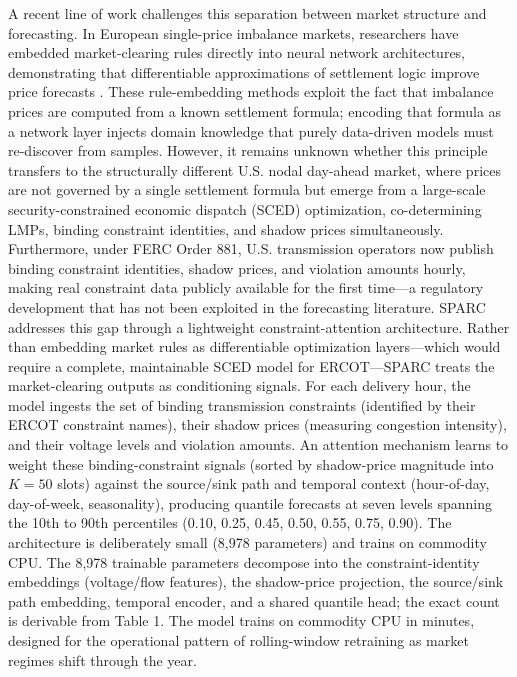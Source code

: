 \documentclass[twoside]{article}
\begin{document}
A recent line of work challenges this separation between market structure and forecasting. In European single-price imbalance markets, researchers have embedded market-clearing rules directly into neural network architectures, demonstrating that differentiable approximations of settlement logic improve price forecasts \cite{yu2026marketruleinformed}. These rule-embedding methods exploit the fact that imbalance prices are computed from a known settlement formula; encoding that formula as a network layer injects domain knowledge that purely data-driven models must re-discover from samples. However, it remains unknown whether this principle transfers to the structurally different U.S. nodal day-ahead market, where prices are not governed by a single settlement formula but emerge from a large-scale security-constrained economic dispatch (SCED) optimization, co-determining LMPs, binding constraint identities, and shadow prices simultaneously. Furthermore, under FERC Order 881, U.S. transmission operators now publish binding constraint identities, shadow prices, and violation amounts hourly, making real constraint data publicly available for the first time---a regulatory development that has not been exploited in the forecasting literature.
SPARC addresses this gap through a lightweight constraint-attention architecture. Rather than embedding market rules as differentiable optimization layers---which would require a complete, maintainable SCED model for ERCOT---SPARC treats the market-clearing outputs as conditioning signals. For each delivery hour, the model ingests the set of binding transmission constraints (identified by their ERCOT constraint names), their shadow prices (measuring congestion intensity), and their voltage levels and violation amounts. An attention mechanism learns to weight these binding-constraint signals (sorted by shadow-price magnitude into $K{=}50$ slots) against the source/sink path and temporal context (hour-of-day, day-of-week, seasonality), producing quantile forecasts at seven levels spanning the 10th to 90th percentiles (0.10, 0.25, 0.45, 0.50, 0.55, 0.75, 0.90). The architecture is deliberately small (8,978 parameters) and trains on commodity CPU. The 8,978 trainable parameters decompose into the constraint-identity embeddings (voltage/flow features), the shadow-price projection, the source/sink path embedding, temporal encoder, and a shared quantile head; the exact count is derivable from Table 1. The model trains on commodity CPU in minutes, designed for the operational pattern of rolling-window retraining as market regimes shift through the year.
\end{document}
